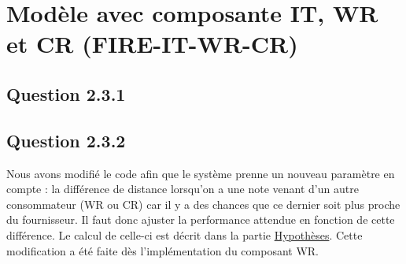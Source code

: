 \section{Modèle avec composante IT, WR et CR (FIRE-IT-WR-CR)}
\subsection{Question 2.3.1}


\subsection{Question 2.3.2}
Nous avons modifié le code afin que le système prenne un nouveau paramètre en compte : la différence de distance lorsqu'on a une note venant d'un autre consommateur (WR ou CR) car il y a des chances que ce dernier soit plus proche du fournisseur. Il faut donc ajuster la performance attendue en fonction de cette différence. Le calcul de celle-ci est décrit dans la partie \hyperref[sec:hypotheses]{Hypothèses}. Cette modification a été faite dès l'implémentation du composant WR.

